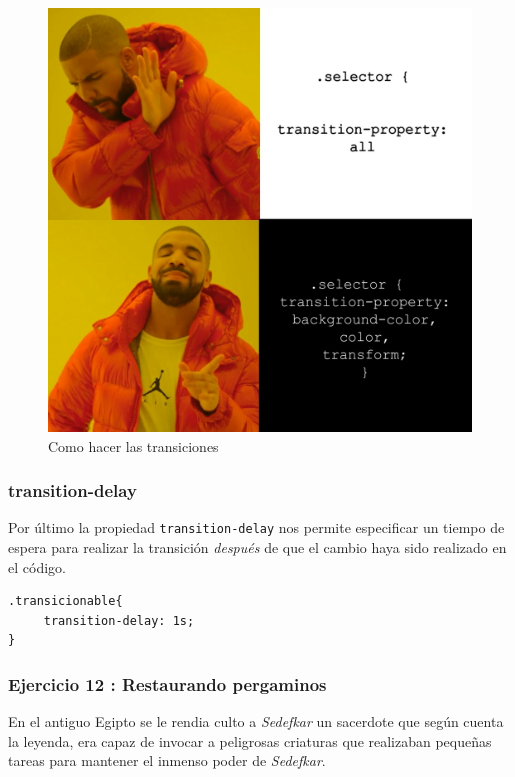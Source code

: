 \documentclass[11pt]{article}
\begin{document}
\begin{figure}[!h]
\centering
\includegraphics[width=.9\linewidth]{./imgs/transitionPropertyMeme.jpg}
\caption{\label{fig:transitionPropertyMeme}Como hacer las transiciones}
\end{figure}


\subsubsection{transition-delay}
\label{sec-1-2-11}

Por último la propiedad \verb~transition-delay~ nos permite especificar un tiempo
de espera para realizar la transición \emph{después} de que el cambio haya sido
realizado en el código.


\begin{verbatim}
.transicionable{
     transition-delay: 1s;
}
\end{verbatim}


\newpage
\subsubsection{Ejercicio 12 : Restaurando pergaminos}
\label{sec-1-2-12}

En el antiguo Egipto se le rendia culto a \emph{Sedefkar} un sacerdote que según
cuenta la leyenda, era capaz de invocar a peligrosas  criaturas que
realizaban pequeñas tareas para mantener el inmenso poder de \emph{Sedefkar}.
\end{document}
